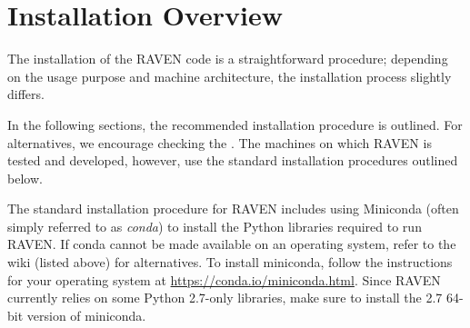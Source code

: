 \section{Installation Overview}

The installation of the RAVEN code is a straightforward procedure;
depending on the usage purpose and machine architecture, the
installation process slightly differs.

In the following sections, the recommended installation procedure is outlined.  For alternatives, we encourage
checking the \wiki.  The machines on which
RAVEN is tested and developed, however, use the standard installation procedures outlined below.

The standard installation procedure for RAVEN includes using Miniconda (often simply referred to as
\emph{conda}) to install the Python libraries required to run RAVEN.  If conda cannot be made available on an
operating system, refer to the wiki (listed above) for alternatives.  To install miniconda, follow the
instructions for your operating system at \url{https://conda.io/miniconda.html}.  Since RAVEN currently relies
on some Python 2.7-only libraries, make sure to install the 2.7 64-bit version of miniconda.
